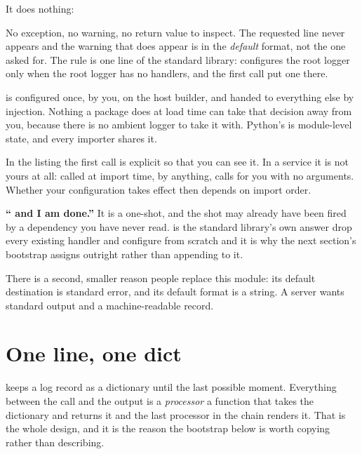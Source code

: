 \noindent
It does nothing:


\noindent
No exception, no warning, no return value to inspect. The requested
 line never appears and the warning that does appear is in the
\emph{default} format, not the one asked for. The rule is one line of the
standard library:  configures the root logger only when
the root logger has no handlers, and the first call put one there.

\begin{csbox}
 is configured once, by you, on the host builder, and handed
to everything else by injection. Nothing a package does at load time can
take that decision away from you, because there is no ambient logger to
take it with. Python's  is module-level state, and every
importer shares it.
\end{csbox}

\noindent
In the listing the first call is explicit so that you can see it. In a
service it is not yours at all:  called at import
time, by anything, calls  for you with no arguments.
Whether your configuration takes effect then depends on import order.

\begin{trapbox}
\textbf{\enquote{ and I am done.}} It is a
one-shot, and the shot may already have been fired by a dependency you
have never read.  is the standard library's own answer
\dash{} drop every existing handler and configure from scratch \dash{} and
it is why the next section's bootstrap assigns 
outright rather than appending to it.
\end{trapbox}

\noindent
There is a second, smaller reason people replace this module: its default
destination is standard error, and its default format is a string. A
server wants standard output and a machine-readable record.

\section{One line, one dict}
\label{sec:ch12-structlog}

 keeps a log record as a dictionary until the last possible
moment. Everything between the call and the output is a \emph{processor}
\dash{} a function that takes the dictionary and returns it \dash{} and the
last processor in the chain renders it. That is the whole design, and it is
the reason the bootstrap below is worth copying rather than describing.

